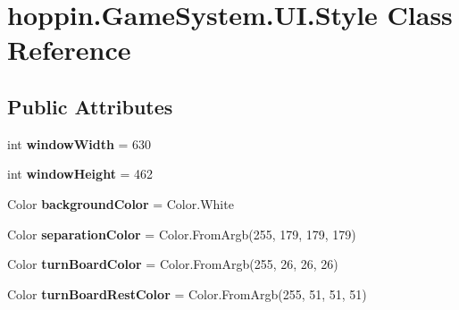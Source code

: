 \hypertarget{classhoppin_1_1_game_system_1_1_u_i_1_1_style}{}\section{hoppin.\+Game\+System.\+U\+I.\+Style Class Reference}
\label{classhoppin_1_1_game_system_1_1_u_i_1_1_style}
\subsection*{Public Attributes}
\begin{DoxyCompactItemize}
\item 
int {\bfseries window\+Width} = 630\hypertarget{classhoppin_1_1_game_system_1_1_u_i_1_1_style_a4360784124b9dbf837322e984e164c03}{}\label{classhoppin_1_1_game_system_1_1_u_i_1_1_style_a4360784124b9dbf837322e984e164c03}

\item 
int {\bfseries window\+Height} = 462\hypertarget{classhoppin_1_1_game_system_1_1_u_i_1_1_style_a80e6ad2d50b7c934a8710a86fdf72886}{}\label{classhoppin_1_1_game_system_1_1_u_i_1_1_style_a80e6ad2d50b7c934a8710a86fdf72886}

\item 
Color {\bfseries background\+Color} = Color.\+White\hypertarget{classhoppin_1_1_game_system_1_1_u_i_1_1_style_ae3e9b970d5840fee32aee2e928e18fe4}{}\label{classhoppin_1_1_game_system_1_1_u_i_1_1_style_ae3e9b970d5840fee32aee2e928e18fe4}

\item 
Color {\bfseries separation\+Color} = Color.\+From\+Argb(255, 179, 179, 179)\hypertarget{classhoppin_1_1_game_system_1_1_u_i_1_1_style_aaaa2c18256cf9dfcb169ed9b87250b24}{}\label{classhoppin_1_1_game_system_1_1_u_i_1_1_style_aaaa2c18256cf9dfcb169ed9b87250b24}

\item 
Color {\bfseries turn\+Board\+Color} = Color.\+From\+Argb(255, 26, 26, 26)\hypertarget{classhoppin_1_1_game_system_1_1_u_i_1_1_style_acb5f5f7ff53860d06a46de6e7dc1cafc}{}\label{classhoppin_1_1_game_system_1_1_u_i_1_1_style_acb5f5f7ff53860d06a46de6e7dc1cafc}

\item 
Color {\bfseries turn\+Board\+Rest\+Color} = Color.\+From\+Argb(255, 51, 51, 51)\hypertarget{classhoppin_1_1_game_system_1_1_u_i_1_1_style_a9d72a42c70ca202f3445cdd3aa6cdc2e}{}\label{classhoppin_1_1_game_system_1_1_u_i_1_1_style_a9d72a42c70ca202f3445cdd3aa6cdc2e}


\end{DoxyCompactItemize}
